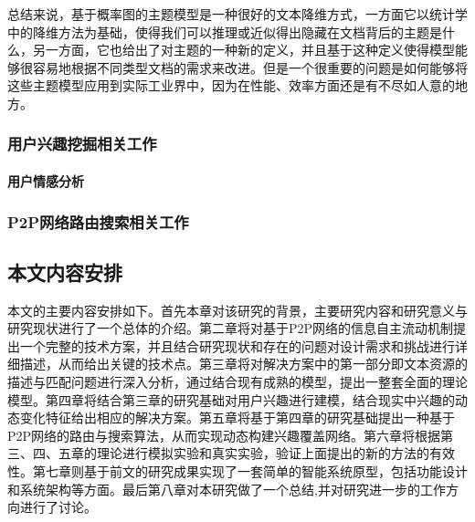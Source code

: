 总结来说，基于概率图的主题模型是一种很好的文本降维方式，一方面它以统计学中的降维方法为基础，使得我们可以推理或近似得出隐藏在文档背后的主题是什么，另一方面，它也给出了对主题的一种新的定义，并且基于这种定义使得模型能够很容易地根据不同类型文档的需求来改进。但是一个很重要的问题是如何能够将这些主题模型应用到实际工业界中，因为在性能、效率方面还是有不尽如人意的地方。

\subsubsection{用户兴趣挖掘相关工作}

\paragraph{用户情感分析}

\subsubsection{P2P网络路由搜索相关工作}

\subsection{本文内容安排}
本文的主要内容安排如下。首先本章对该研究的背景，主要研究内容和研究意义与研究现状进行了一个总体的介绍。第二章将对基于P2P网络的信息自主流动机制提出一个完整的技术方案，并且结合研究现状和存在的问题对设计需求和挑战进行详细描述，从而给出关键的技术点。第三章将对解决方案中的第一部分即文本资源的描述与匹配问题进行深入分析，通过结合现有成熟的模型，提出一整套全面的理论模型。第四章将结合第三章的研究基础对用户兴趣进行建模，结合现实中兴趣的动态变化特征给出相应的解决方案。第五章将基于第四章的研究基础提出一种基于P2P网络的路由与搜索算法，从而实现动态构建兴趣覆盖网络。第六章将根据第三、四、五章的理论进行模拟实验和真实实验，验证上面提出的新的方法的有效性。第七章则基于前文的研究成果实现了一套简单的智能系统原型，包括功能设计和系统架构等方面。最后第八章对本研究做了一个总结,并对研究进一步的工作方向进行了讨论。

